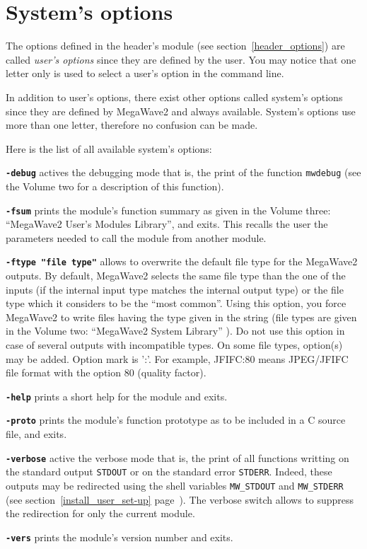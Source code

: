 \section{System's options}
\label{header_optsys}

The options defined in the header's module (see section~\ref{header_options})
are called {\em user's options} since they are defined by the user.
You may notice that one letter only is used to select a user's option in
the command line.

In addition to user's options, there exist other options called 
system's options since they are defined by MegaWave2 and always available.
System's options use more than one letter, therefore no confusion can be
made.

Here is the list of all available system's options:

{\bf \verb+-debug+}
actives the debugging mode that is, the print of the function \verb+mwdebug+
(see the Volume two for a description of this function).

{\bf \verb+-fsum+}
prints the module's function summary as given in the Volume three: ``MegaWave2 User's Modules Library'', and exits. 
This recalls the user the parameters needed to call the module from
another module.

{\bf \verb+-ftype "file type"+}
allows to overwrite the default file type for the MegaWave2 outputs.
By default, MegaWave2 selects the same file type than the one of the
inputs (if the internal input type matches the internal output type)
or the file type which it considers to be the ``most common''.
Using this option, you force MegaWave2 to write files having the
type given in the string (file types are given in the Volume two: 
``MegaWave2 System Library'' ).
Do not use this option in case of several outputs with incompatible types. 
On some file types, option(s) may be added. Option mark is ':'.
For example, JFIFC:80 means JPEG/JFIFC file format with the 
option 80 (quality factor).

{\bf \verb+-help+}
prints a short help for the module and exits.

{\bf \verb+-proto+}
prints the module's function prototype as to be included in a C source file, and
exits.

{\bf \verb+-verbose+}
active the verbose mode that is, the print of all functions writting on
the standard output \verb+STDOUT+ or on the standard error \verb+STDERR+.
Indeed, these outputs may be redirected using the shell variables
\verb+MW_STDOUT+ and 
\verb+MW_STDERR+ 
(see section~\ref{install_user_set-up} page~\pageref{install_user_set-up}).
The verbose switch allows to suppress the redirection for only the 
current module.

{\bf \verb+-vers+}
prints the module's version number and exits.
